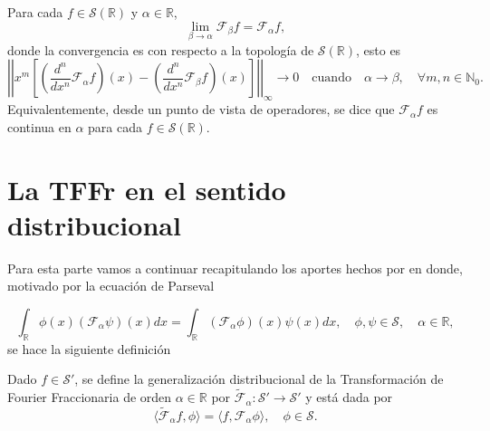         \begin{theorem*}
            Para cada $f \in \mathcal{S}\left(\mathbb{R}\right)$ y $\alpha \in \mathbb{R}$,
            \begin{equation*}
                \lim_{\beta \to \alpha} \mathcal{F}_\beta f = \mathcal{F}_\alpha f,
            \end{equation*} 
            donde la convergencia es con respecto a la topología de $\mathcal{S}\left(\mathbb{R}\right)$, esto es 
            \begin{equation*}
                \left| \left|  x^m\left[ \left(\frac{d^n}{dx^n}\mathcal{F}_\alpha f\right)(x) - \left(\frac{d^n}{dx^n}\mathcal{F}_\beta f \right)(x) \right] \right|\right|_\infty \to 0 \quad \text{cuando} \quad \alpha\to \beta, \quad \forall m,n \in \mathbb{N}_0.
            \end{equation*}
            Equivalentemente, desde un punto de vista de operadores, se dice que $\mathcal{F}_\alpha f$ es continua en $\alpha$ para cada $f \in \mathcal{S}\left(\mathbb{R}\right)$.
        \end{theorem*}

    \section{La TFFr en el sentido distribucional}
        
        Para esta parte vamos a continuar recapitulando los aportes hechos por \citep{kerr1988distributional} en donde, motivado por la ecuación de Parseval

        \begin{equation*}
            \int_{\mathbb{R}}\phi(x) \left(\mathcal{F}_\alpha \psi \right)(x) dx = \int_{\mathbb{R}} \left( \mathcal{F}_\alpha \phi \right)(x) \psi(x)dx, \quad \phi,\psi \in \mathcal{S}, \quad \alpha \in \mathbb{R},
        \end{equation*}
        se hace la siguiente definición

        \begin{definition*}
            Dado $f \in \mathcal{S}'$, se define la generalización distribucional de la Transformación de Fourier Fraccionaria de orden $\alpha \in \mathbb{R}$ por $\tilde{\mathcal{F}}_\alpha: \mathcal{S}' \to \mathcal{S}'$ y está dada por 
            \begin{equation*}
                \langle \tilde{\mathcal{F}}_\alpha f, \phi \rangle = \langle f, \mathcal{F}_\alpha\phi \rangle, \quad \phi \in \mathcal{S}.
            \end{equation*}
        \end{definition*}


